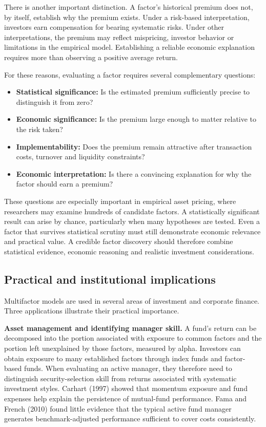 There is another important distinction. A factor's historical premium does not, by itself, establish why the premium exists. Under a risk-based interpretation, investors earn compensation for bearing systematic risks. Under other interpretations, the premium may reflect mispricing, investor behavior or limitations in the empirical model. Establishing a reliable economic explanation requires more than observing a positive average return.

For these reasons, evaluating a factor requires several complementary questions:

\begin{itemize}
  \item \textbf{Statistical significance:} Is the estimated premium sufficiently precise to distinguish it from zero?
  \item \textbf{Economic significance:} Is the premium large enough to matter relative to the risk taken?
  \item \textbf{Implementability:} Does the premium remain attractive after transaction costs, turnover and liquidity constraints?
  \item \textbf{Economic interpretation:} Is there a convincing explanation for why the factor should earn a premium?
\end{itemize}

These questions are especially important in empirical asset pricing, where researchers may examine hundreds of candidate factors. A statistically significant result can arise by chance, particularly when many hypotheses are tested. Even a factor that survives statistical scrutiny must still demonstrate economic relevance and practical value. A credible factor discovery should therefore combine statistical evidence, economic reasoning and realistic investment considerations.



\subsection{Practical and institutional implications}
\label{sec:03-implications}

Multifactor models are used in several areas of investment and corporate finance. Three applications illustrate their practical importance.

\textbf{Asset management and identifying manager skill.}
A fund's return can be decomposed into the portion associated with exposure to common factors and the portion left unexplained by those factors, measured by alpha. Investors can obtain exposure to many established factors through index funds and factor-based funds. When evaluating an active manager, they therefore need to distinguish security-selection skill from returns associated with systematic investment styles. Carhart (1997) showed that momentum exposure and fund expenses help explain the persistence of mutual-fund performance. Fama and French (2010) found little evidence that the typical active fund manager generates benchmark-adjusted performance sufficient to cover costs consistently.

